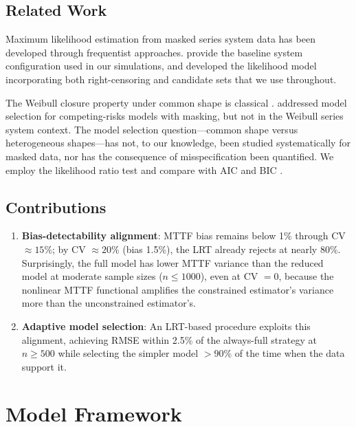 \documentclass[11pt]{article}
\begin{document}
\subsection{Related Work}

Maximum likelihood estimation from masked series system data has been developed through frequentist \citep{Usher-1988, Lin-1993, Joh-1989} approaches. \citet{Huairu-2013} provide the baseline system configuration used in our simulations, and \citet{towell2023reliability} developed the likelihood model incorporating both right-censoring and candidate sets that we use throughout.

The Weibull closure property under common shape is classical \citep{barlow1975}. \citet{Craiu-2005} addressed model selection for competing-risks models with masking, but not in the Weibull series system context. The model selection question---common shape versus heterogeneous shapes---has not, to our knowledge, been studied systematically for masked data, nor has the consequence of misspecification been quantified. We employ the likelihood ratio test \citep{wilks1938} and compare with AIC \citep{akaike1974} and BIC \citep{schwarz1978}.

\subsection{Contributions}

\begin{enumerate}
\item \textbf{Bias-detectability alignment}: MTTF bias remains below 1\% through CV $\approx 15\%$; by CV $\approx 20\%$ (bias 1.5\%), the LRT already rejects at nearly 80\%. Surprisingly, the full model has lower MTTF variance than the reduced model at moderate sample sizes ($n \leq 1000$), even at CV $= 0$, because the nonlinear MTTF functional amplifies the constrained estimator's variance more than the unconstrained estimator's.

\item \textbf{Adaptive model selection}: An LRT-based procedure exploits this alignment, achieving RMSE within 2.5\% of the always-full strategy at $n \geq 500$ while selecting the simpler model $> 90\%$ of the time when the data support it.
\end{enumerate}

\section{Model Framework}
\label{sec:framework}
\end{document}
